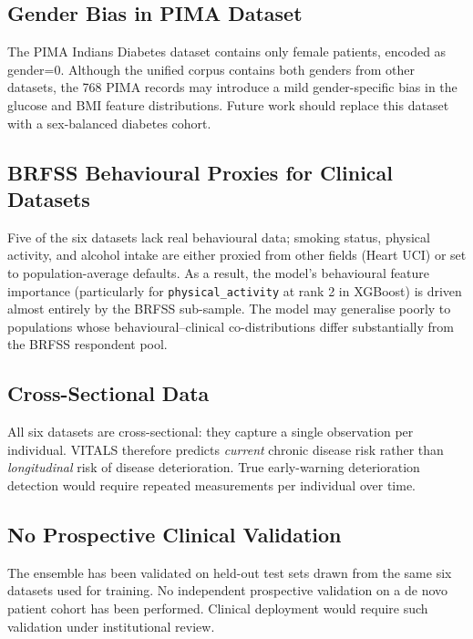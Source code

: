 \documentclass[12pt,a4paper]{report}
\begin{document}
\subsection{Gender Bias in PIMA Dataset}

The PIMA Indians Diabetes dataset contains only female patients, encoded as gender=0. Although the unified corpus contains both genders from other datasets, the 768 PIMA records may introduce a mild gender-specific bias in the glucose and BMI feature distributions. Future work should replace this dataset with a sex-balanced diabetes cohort.

\subsection{BRFSS Behavioural Proxies for Clinical Datasets}

Five of the six datasets lack real behavioural data; smoking status, physical activity, and alcohol intake are either proxied from other fields (Heart UCI) or set to population-average defaults. As a result, the model's behavioural feature importance (particularly for \texttt{physical\_activity} at rank 2 in XGBoost) is driven almost entirely by the BRFSS sub-sample. The model may generalise poorly to populations whose behavioural--clinical co-distributions differ substantially from the BRFSS respondent pool.

\subsection{Cross-Sectional Data}

All six datasets are cross-sectional: they capture a single observation per individual. VITALS therefore predicts \textit{current} chronic disease risk rather than \textit{longitudinal} risk of disease deterioration. True early-warning deterioration detection would require repeated measurements per individual over time.

\subsection{No Prospective Clinical Validation}

The ensemble has been validated on held-out test sets drawn from the same six datasets used for training. No independent prospective validation on a de novo patient cohort has been performed. Clinical deployment would require such validation under institutional review.
\end{document}
